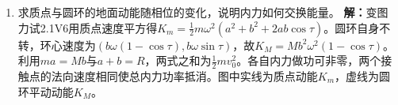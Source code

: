 \documentclass[UTF8,fontset=fandol,a4paper,11pt]{ctexart}
\begin{document}
\begin{enumerate}
\item 求质点与圆环的地面动能随相位的变化，说明内力如何交换能量。
\textbf{解：}变图力试2.1V6用质点速度平方得$K_m=\tfrac12m\omega^2(a^2+b^2+2ab\cos\tau)$。圆环自身不转，环心速度为$(b\omega(1-\cos\tau),b\omega\sin\tau)$，故$K_M=M b^2\omega^2(1-\cos\tau)$。利用$ma=Mb$与$a+b=R$，两式之和为$\tfrac12mv_0^2$。各自内力做功可非零，两个接触点的法向速度相同使总内力功率抵消。图中实线为质点动能$K_m$，虚线为圆环平动动能$K_M$。
\begin{center}\begin{minipage}{.98\linewidth}\centering
{}
\end{minipage}
\end{center}
\end{enumerate}
\end{document}
